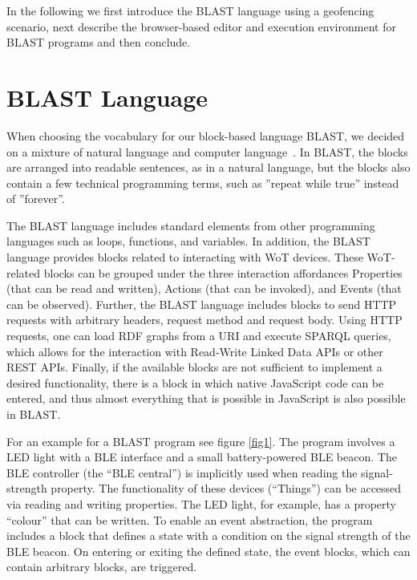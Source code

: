 \documentclass[runningheads]{llncs}
\begin{document}
In the following we first introduce the BLAST language using a geofencing scenario, next describe the browser-based editor and execution environment for BLAST programs and then conclude.

\section{BLAST Language}

When choosing the vocabulary for our block-based language BLAST, we decided on a mixture of natural language and computer language~\cite{8120404}.
In BLAST, the blocks are arranged into readable sentences, as in a natural language, but the blocks also contain a few technical programming terms, such as ''repeat while true'' instead of ''forever''.

The BLAST language includes standard elements from other programming languages such as loops, functions, and variables.
In addition, the BLAST language provides blocks related to interacting with WoT devices.
These WoT-related blocks can be grouped under the three interaction affordances Properties (that can be read and written), Actions (that can be invoked), and Events (that can be observed).
Further, the BLAST language includes blocks to send HTTP requests with arbitrary headers, request method and request body.
Using HTTP requests, one can load RDF graphs from a URI and execute SPARQL queries, which allows for the interaction with Read-Write Linked Data APIs or other REST APIs.
Finally, if the available blocks are not sufficient to implement a desired functionality, there is a block in which native JavaScript code can be entered, and thus almost everything that is possible in JavaScript is also possible in BLAST.

For an example for a BLAST program see figure \ref{fig1}.
The program involves a LED light with a BLE interface and a small battery-powered BLE beacon.
The BLE controller (the ``BLE central'') is implicitly used when reading the signal-strength property.
The functionality of these devices (``Things'') can be accessed via reading and writing properties.
The LED light, for example, has a property ``colour'' that can be written.
To enable an event abstraction, the program includes a block that defines a state with a condition on the signal strength of the BLE beacon.
On entering or exiting the defined state, the event blocks, which can contain arbitrary blocks, are triggered.
\end{document}
